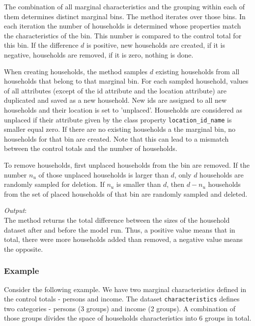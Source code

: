 The combination of all marginal characteristics and the grouping within each
of them determines distinct marginal bins.  The method iterates over those
bins. In each iteration the number of households is determined whose
properties match the characteristics of the bin. This number is compared to
the control total for this bin. If the difference $d$ is positive, new
households are created, if it is negative, households are removed, if it is
zero, nothing is done.

When creating households, the method samples $d$ existing households from all 
households that belong to that marginal bin. For each sampled household, values of all attributes 
(except of the id attribute and the location attribute)
are duplicated and saved as a new household. New ids are assigned 
to all new households and their location is set to 'unplaced'.  
Households are considered as unplaced if their
attribute given by the class property \verb|location_id_name|
is smaller equal zero. If there are no existing households a the marginal bin,
no households for that bin are created. Note that this can lead to a mismatch 
between the control totals and the number of households. 

To remove households, first unplaced households from the bin are removed. If
the number $n_u$ of those unplaced households is larger than $d$, only $d$
households are randomly sampled for deletion. If $n_u$ is smaller than $d$,
then $d-n_u$ households from the set of placed households of that bin are
randomly sampled and deleted. 

{\it Output}:~\\[1mm]
The method returns the total difference between the sizes of the household
dataset after and before the model run. Thus, a positive value means that in
total, there were more households added than removed, a negative value means
the opposite.

%
\subsubsection{Example}
%
Consider the following example. We have two marginal characteristics defined
in the control totals - persons and income. The dataset \verb|characteristics|
defines two categories - persons (3 groups) and income (2 groups). 
A combination of those groups divides the space of households
characteristics into 6 groups in total.


